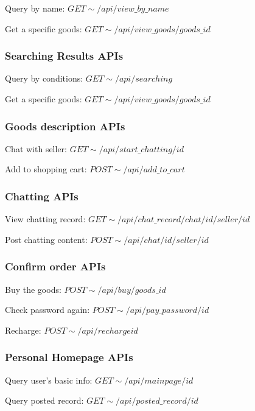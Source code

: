 \documentclass[12pt]{article}  %
\begin{document}
Query by name: $GET\sim/api/view\_by\_name$

Get a specific goods: $GET\sim/api/view\_goods/{goods\_id}$

\subsubsection*{Searching Results APIs}

Query by conditions: $GET\sim/api/searching$

Get a specific goods: $GET\sim/api/view\_goods/{goods\_id}$

\subsubsection*{Goods description APIs}

Chat with seller: $GET\sim/api/start\_chatting/{id}$

Add to shopping cart: $POST\sim/api/add\_to\_cart$

\subsubsection*{Chatting APIs}

View chatting record: $GET\sim/api/chat\_record/chat/{id}/seller/{id}$

Post chatting content: $POST\sim/api/chat/{id}/seller/{id}$

\vspace{-10pt}

\subsubsection*{Confirm order APIs}

Buy the goods: $POST\sim/api/buy/{goods\_id}$

Check password again: $POST\sim/api/pay\_password/{id}$

Recharge: $POST\sim/api/recharge{id}$

\vspace{-10pt}

\subsubsection*{Personal Homepage APIs}

Query user's basic info: $GET\sim/api/mainpage/{id}$

Query posted record: $GET\sim/api/posted\_record/{id}$
\end{document}
